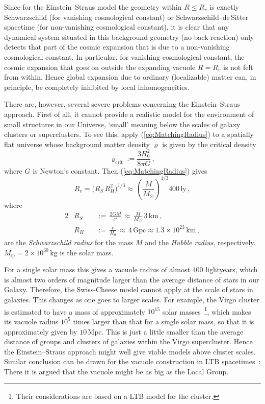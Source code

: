 \documentclass
[rmp,aps,twocolumn,showpacs,preprintnumbers,amsmath,amssymb]{revtex4}
\theoremstyle{plain}
\theoremstyle{definition}
\theoremstyle{remark}
\begin{document}
Since for the Einstein--Straus model the geometry within $R \leq R_v$ is 
exactly Schwarzschild (for vanishing cosmological constant) or 
Schwarzschild--de\,Sitter spacetime (for non-vanishing cosmological 
constant), it is clear that any dynamical system situated in this 
background geometry (no back reaction) only detects that part of 
the cosmic expansion that is due to a non-vanishing cosmological 
constant. In particular, for vanishing cosmological constant, the 
cosmic expansion that goes on outside the expanding vacuole $R=R_v$ is
not felt from within. Hence global expansion due to ordinary 
(localizable) matter can, in principle, be completely inhibited 
by local inhomogeneities. 

There are, however, several severe problems concerning the Einstein--Straus 
approach. First of all, it cannot provide a realistic model for the 
environment of small structures in our Universe, `small' meaning below the 
scales of galaxy clusters or superclusters. To see this, apply 
(\ref{eq:MatchingRadius}) to a spatially flat universe whose background 
matter density $\varrho$ is given by the critical density 
%
\begin{equation}\label{eq:DefCriticalDensity}
  \varrho_{\mathrm{crit}} := \frac{3H_0^2}{8\pi G}\,,
\end{equation}
%
where $G$ is Newton's constant. Then (\ref{eq:MatchingRadius}) gives 
%
\begin{equation}\label{eq:MatchingRadius-1}
  R_v = \bigl(R_S\,R^2_H\bigr)^{1/3}  
     \approx \, \left( \frac{M}{M_\odot} \right)^{1/3} 400\,\mathrm{ly} \,,
\end{equation}
%
where 
%
\begin{alignat}{2}
\label{eq:DefSchwarzschildRadius}
& R_S&&\,:=\,\frac{2GM}{c^2}
     \,\approx\,\frac{M}{M_{\odot}}\ 3\,\mathrm{km}\,,\\
\label{eq:DefHubbleRadius}
&R_H&&\,:=\,\frac{c}{H_0}
   \,\approx\,4\,\mathrm{Gpc}\approx 1.3\times 10^{23}\,\mathrm{km}\,,
\end{alignat}
%
are the \emph{Schwarzschild radius} for the mass $M$ and the 
\emph{Hubble radius}, respectively. 
$M_{\odot}=2\times 10^{30}\,\mathrm{kg}$ is the solar mass. 

For a single solar mass this gives a vacuole radius of almost 
400 lightyears, which is almost two orders of magnitude larger than the 
average distance of stars in our Galaxy. Therefore, the 
Swiss-Cheese model cannot apply at the scale of stars in galaxies.    
This changes as one goes to larger scales. For example, the Virgo 
cluster is estimated to have a mass of approximately $10^{15}$ solar 
masses~\cite{Fouque.etal}\footnote{Their considerations are based on 
a LTB model for the cluster.}, which makes its vacuole radius $10^5$ 
times larger than that for a single solar mass, so that it is approximately 
given by $10\,\mathrm{Mpc}$. 
This is just a little smaller than the average distance of groups 
and clusters of galaxies within the Virgo supercluster. Hence the 
Einstein--Straus approach might well give viable models above cluster 
scales. Similar conclusion can be drawn for the vacuole construction 
in LTB spacetimes~\cite{Bonnor:2000b}: There it is argued that the 
vacuole might be as big as the Local Group.
\end{document}
